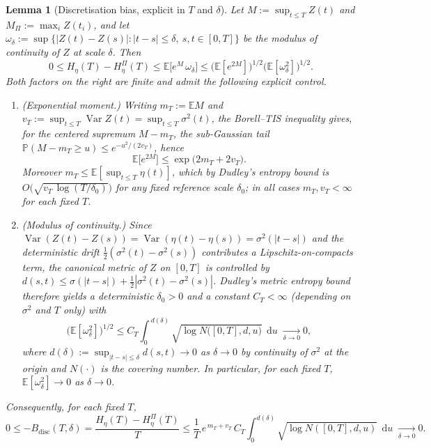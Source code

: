 \documentclass{amsart}
\newtheorem{lemma}{Lemma}
\theoremstyle{definition}
\DeclareMathOperator{\Var}{Var}
\newcommand{\E}{\mathbb{E}}
\newcommand{\PP}{\mathbb{P}}
\newcommand{\dd}{\,\mathrm{d}}
\begin{document}
\begin{lemma}[Discretisation bias, explicit in $T$ and $\delta$]\label{lem:disc}
Let $M:=\sup_{t\le T}Z(t)$ and $M_\Pi:=\max_i Z(t_i)$, and let
$\omega_\delta:=\sup\{|Z(t)-Z(s)|:|t-s|\le\delta,\ s,t\in[0,T]\}$ be the modulus
of continuity of $Z$ at scale $\delta$. Then
\begin{equation}\label{eq:discbound}
   0\le H_\eta(T)-H_\eta^{\Pi}(T)
   \le \E\big[e^{M}\,\omega_\delta\big]
   \le \big(\E[e^{2M}]\big)^{1/2}\big(\E[\omega_\delta^2]\big)^{1/2}.
\end{equation}
Both factors on the right are finite and admit the following explicit control.
\begin{enumerate}
\item[\textnormal{(i)}] \textnormal{(Exponential moment.)} Writing
  $m_T:=\E M$ and $v_T:=\sup_{t\le T}\Var Z(t)=\sup_{t\le T}\sigma^2(t)$, the
  Borell--TIS inequality gives, for the centered supremum
  $M-m_T$, the sub-Gaussian tail $\PP(M-m_T\ge u)\le e^{-u^2/(2v_T)}$, hence
  \begin{equation}\label{eq:eM}
    \E\big[e^{2M}\big]\le \exp\big(2m_T+2v_T\big).
  \end{equation}
  Moreover $m_T\le \E[\sup_{t\le T}\eta(t)]$, which by Dudley's entropy bound is
  $O\big(\sqrt{v_T\,\log(T/\delta_0)}\big)$ for any fixed reference scale
  $\delta_0$; in all cases $m_T,v_T<\infty$ for each fixed $T$.
\item[\textnormal{(ii)}] \textnormal{(Modulus of continuity.)} Since
  $\Var(Z(t)-Z(s))=\Var(\eta(t)-\eta(s))=\sigma^2(|t-s|)$ and the deterministic
  drift $\tfrac12(\sigma^2(t)-\sigma^2(s))$ contributes a Lipschitz-on-compacts
  term, the canonical metric of $Z$ on $[0,T]$ is controlled by
  $d(s,t)\le \sigma(|t-s|)+\tfrac12|\sigma^2(t)-\sigma^2(s)|$. Dudley's metric
  entropy bound therefore yields a deterministic $\delta_0>0$ and a constant
  $C_T<\infty$ (depending on $\sigma^2$ and $T$ only) with
  \begin{equation}\label{eq:omega}
    \big(\E[\omega_\delta^2]\big)^{1/2}\le C_T\!\int_0^{\,d(\delta)}\!\!
       \sqrt{\log N\!\big([0,T],d,u\big)}\;\dd u\;\xrightarrow[\delta\to0]{}0,
  \end{equation}
  where $d(\delta):=\sup_{|t-s|\le\delta}d(s,t)\to0$ as $\delta\to0$ by
  continuity of $\sigma^2$ at the origin and $N(\cdot)$ is the covering number.
  In particular, for each fixed $T$, $\E[\omega_\delta^2]\to0$ as $\delta\to0$.
\end{enumerate}
Consequently, for each fixed $T$,
\begin{equation}\label{eq:discgoal}
   0\le -B_{\mathrm{disc}}(T,\delta)=\frac{H_\eta(T)-H_\eta^\Pi(T)}{T}
   \le \frac{1}{T}\,e^{\,m_T+v_T}\,C_T\!\int_0^{d(\delta)}\!\!\sqrt{\log N([0,T],d,u)}\;\dd u
   \;\xrightarrow[\delta\to0]{}0 .
\end{equation}
\end{lemma}
\end{document}
